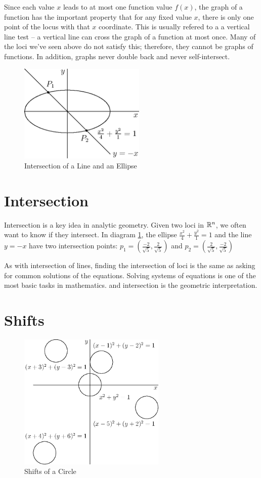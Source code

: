 \documentclass[fleqn]{report}
\begin{document}
Since each value $x$ leads to at most one function value $f(x)$,
the graph of a function has the important property that for any
fixed value $x$, there is only one point of the locus with that
$x$ coordinate. This is usually refered to a a vertical line
test -- a vertical line can cross the graph of a function at
most once. Many of the loci we've seen above do not satisfy
this; therefore, they cannot be graphs of functions. In
addition, graphs never double back and never self-intersect. 

\begin{figure}[b]
\centering
\includegraphics[width=6cm]{figure24.eps}
\caption{Intersection of a Line and an Ellipse}
\label{Intersection of a Line and an Ellipse}
\end{figure}

\section*{Intersection}

Intersection is a key idea in analytic geometry. Given two
loci in $\mathbb{R}^n$, we often want to know if they intersect.
In diagram \ref{Intersection of a Line and an Ellipse}, the
ellipse $\frac{x^2}{4} + \frac{y^2}{1} = 1 $ and
the line $y=-x$ have two intersection points:
$p_1 = (\frac{-2}{\sqrt{5}},\frac{2}{\sqrt{5}})$ and
$p_2 = (\frac{2}{\sqrt{5}},\frac{-2}{\sqrt{5}})$ 

As with intersection of lines, finding the intersection of
loci is the same as asking for common solutions of the 
equations. Solving systems of equations is one of the most
basic tasks in mathematics. and intersection is the geometric
interpretation.

\section*{Shifts}

\begin{figure}[t]
\centering
\includegraphics[width=7cm]{figure25.eps}
\caption{Shifts of a Circle}
\label{Shifts of a Circle}
\end{figure}
\end{document}
